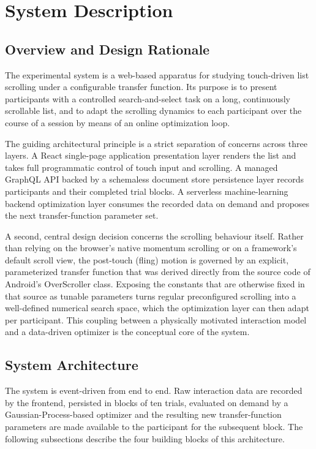 \chapter{System Description}

\section{Overview and Design Rationale}

The experimental system is a web-based apparatus for studying touch-driven list scrolling under a configurable transfer function. Its purpose is to present participants with a controlled search-and-select task on a long, continuously scrollable list, and to adapt the scrolling dynamics to each participant over the course of a session by means of an online optimization loop.

The guiding architectural principle is a strict separation of concerns across three layers. A React single-page application presentation layer renders the list and takes full programmatic control of touch input and scrolling. A managed GraphQL API backed by a schemaless document store persistence layer records participants and their completed trial blocks. A serverless machine-learning backend optimization layer consumes the recorded data on demand and proposes the next transfer-function parameter set.

A second, central design decision concerns the scrolling behaviour itself. Rather than relying on the browser's native momentum scrolling or on a framework's default scroll view, the post-touch (fling) motion is governed by an explicit, parameterized transfer function that was derived directly from the source code of Android's OverScroller class. Exposing the constants that are otherwise fixed in that source as tunable parameters turns regular preconfigured scrolling into a well-defined numerical search space, which the optimization layer can then adapt per participant. This coupling between a physically motivated interaction model and a data-driven optimizer is the conceptual core of the system.

\section{System Architecture}

The system is event-driven from end to end. Raw interaction data are recorded by the frontend, persisted in blocks of ten trials, evaluated on demand by a Gaussian-Process-based optimizer and the resulting new transfer-function parameters are made available to the participant for the subsequent block. The following subsections describe the four building blocks of this architecture.

